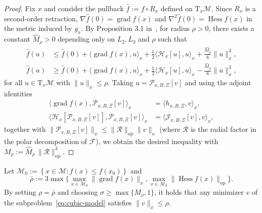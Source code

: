 \documentclass[final,onefignum,onetabnum]{siamart250211}
\DeclareMathOperator{\grad}{grad}
\newcommand{\Hess}{\operatorname{Hess}}
\begin{document}
  \begin{proof}
  Fix $x$ and consider the pullback $\hat f:=f\circ R_x$ defined on $\mathrm{T}_x\mathcal{M}$. Since $R_x$ is a second-order retraction, $\nabla\hat f(0)=\grad f(x)$ and $\nabla^{2}\hat f(0)=\Hess f(x)$ in the metric induced by $g_x$. By Proposition 3.1 in~\cite{zhang2018cubic}, for radius $ \rho > 0$, there exists a constant $\widehat M_{\rho}>0$ depending only on $L_2, L_3$ and $\rho$ such that
  \begin{subequations}
  \begin{align}
  \hat f(u)&\le \hat f(0)+\langle \grad f(x),u\rangle_x+\tfrac{1}{2}\langle \mathcal{H}_x [u],u\rangle_x+\tfrac{\widehat M_{\rho}}{6}\|u\|_x^{3}, \label{eq:cubic-upper-bound-1} \\
  \hat f(u)&\ge \hat f(0) +\langle \grad f(x),u\rangle_x+\tfrac{1}{2}\langle \mathcal{H}_x [u],u\rangle_x - \tfrac{\widehat M_{\rho}}{6}\|u\|_x^{3}, \label{eq:cubic-upper-bound-2}
  \end{align}
  \end{subequations}
  for all $u\in\mathrm{T}_x\mathcal{M}$ with $\|u\|_x\le \rho$.
  Taking $u = \mathcal{P}_{x, B, \Xi} [v]$ and using the adjoint identities
  \[
  \begin{aligned}
  \langle \grad f(x),\mathcal{P}_{x, B, \Xi} [v]\rangle_x &= \langle h_{x, B, \Xi},v\rangle_x, \\
  \langle \mathcal{H}_x [\mathcal{P}_{x, B, \Xi} [v]],\mathcal{P}_{x, B, \Xi} [v]\rangle_x &=\langle \mathcal{J}_{x, B, \Xi} [v],v\rangle_x,
  \end{aligned}
  \]
  together with $\| \mathcal{P}_{x, B, \Xi} [v] \|_x \leq \|\mathcal{R}\|_{\mathrm{op}}\|v\|_x$ (where $\mathcal{R}$ is the radial factor in the polar decomposition of $\mathcal{F}$), we obtain the desired inequality with $M_\rho:=\widehat M_{\rho}\,\|\mathcal{R}\|_{\mathrm{op}}^{3}$.
\end{proof}

\begin{lemma}
  Let $\mathcal{M}_0:=\left\{x \in \mathcal{M}: f(x) \leq f\left(x_0\right)\right\}$ and \[
  \bar \rho := 3 \max \{ \max_{x \in \mathcal{M}_0} \| \grad f(x) \|_x, \max_{x \in \mathcal{M}_0} \| \Hess f(x) \|_{\mathrm{op}} \}.
  \]
  By setting $\rho=\bar\rho$ and choosing $\sigma\ge \max\{M_\rho,1\}$, it holds that any minimizer $v$ of the subproblem~\eqref{eq:cubic-model} satisfies $\|v\|_x\le \rho$.
\end{lemma}
\end{document}
